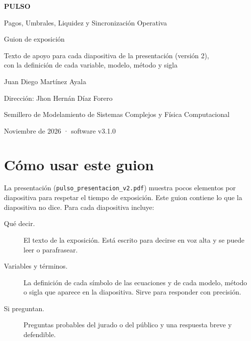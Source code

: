 \documentclass[11pt,a4paper,oneside]{article}
\begin{document}
\begin{titlepage}
\centering
\vspace*{3cm}
{\sffamily\bfseries\Huge\color{azul} PULSO\par}
\vspace{0.2cm}
{\sffamily\large\color{gris} Pagos, Umbrales, Liquidez y Sincronización Operativa\par}
\vspace{0.9cm}
{\sffamily\LARGE Guion de exposición\par}
\vspace{0.4cm}
{\large Texto de apoyo para cada diapositiva de la presentación (versión 2),\\
con la definición de cada variable, modelo, método y sigla\par}
\vfill
{\large Juan Diego Martínez Ayala\par}
{\normalsize Dirección: Jhon Hernán Díaz Forero\par}
{\normalsize Semillero de Modelamiento de Sistemas Complejos y Física Computacional\par}
\vspace{0.4cm}
{\normalsize Noviembre de 2026 · software v3.1.0\par}
\end{titlepage}

\tableofcontents
\clearpage

\section*{Cómo usar este guion}

La presentación (\texttt{pulso\_presentacion\_v2.pdf}) muestra pocos elementos por
diapositiva para respetar el tiempo de exposición. Este guion contiene lo que la
diapositiva no dice. Para cada diapositiva incluye:

\begin{description}
\item[Qué decir.] El texto de la exposición. Está escrito para decirse en voz alta y se
puede leer o parafrasear.
\item[Variables y términos.] La definición de cada símbolo de las ecuaciones y de cada
modelo, método o sigla que aparece en la diapositiva. Sirve para responder con
precisión.
\item[Si preguntan.] Preguntas probables del jurado o del público y una respuesta
breve y defendible.
\end{description}
\end{document}
